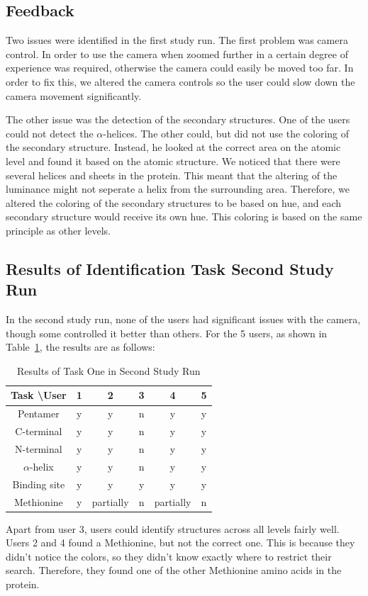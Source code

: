 \documentclass[review,journal]{vgtc}         %
\begin{document}
	\subsection{Feedback}
	Two issues were identified in the first study run. 
	The first problem was camera control. 
	In order to use the camera when zoomed further in a certain degree of experience was required, otherwise the camera could easily be moved too far.
	In order to fix this, we altered the camera controls so the user could slow down the camera movement significantly.
	
	The other issue was the detection of the secondary structures. 
	One of the users could not detect the $\alpha$-helices. The other could, but did not use the coloring of the secondary structure.
	Instead, he looked at the correct area on the atomic level and found it based on the atomic structure.
	We noticed that there were several helices and sheets in the protein. 
	This meant that the altering of the luminance might not seperate a helix from the surrounding area. 
	Therefore, we altered the coloring of the secondary structures to be based on hue, and each secondary structure would receive its own hue.
	This coloring is based on the same principle as other levels.
	
	
	\subsection{Results of Identification Task Second Study Run}
	In the second study run, none of the users had significant issues with the camera, though some controlled it better than others.
	For the 5 users, as shown in Table~\ref{table:seconrund}, the results are as follows:
	\begin{table}
		
		\centering
		\begin{tabular}{| c | c | c | c | c | c |}
			\hline
			Task \textbackslash User & 1 & 2 & 3 & 4 & 5 \\
			\hline
			Pentamer       & y & y & n & y & y\\
			\hline
			C-terminal     & y & y & n & y & y \\
			\hline
			N-terminal     & y & y & n & y & y  \\
			\hline
			$\alpha$-helix & y & y & n & y & y \\
			\hline
			Binding site   & y & y & y & y & y \\
			\hline
			Methionine      & y & partially & n & partially & n  \\
			\hline
		\end{tabular}
		\caption{Results of Task One in Second Study Run}
		\label{table:seconrund}
	\end{table}
	Apart from user 3, users could identify structures across all levels fairly well. 
	Users 2 and 4 found a Methionine, but not the correct one. 
	This is because they didn't notice the colors, so they didn't know exactly where to restrict their search.
	Therefore, they found one of the other Methionine amino acids in the protein.
	
\end{document}
